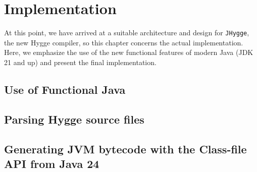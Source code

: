 \chapter{Implementation}

At this point, we have arrived at a suitable architecture and design for \texttt{JHygge}, the new Hygge compiler, so this chapter concerns the actual
implementation. Here, we emphasize the use of the new functional features of modern Java (JDK 21 and up) and present the final implementation. 

\section{Use of Functional Java}

\section{Parsing Hygge source files}

\section{Generating JVM bytecode with the Class-file API from Java 24}
